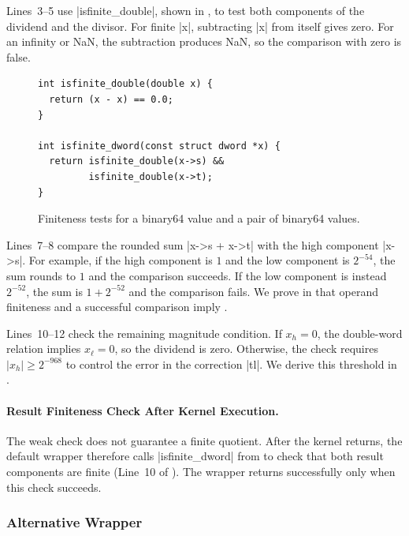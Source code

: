 Lines~3--5 use \ccode|isfinite_double|, shown in
, to test both components of the dividend and
the divisor. For finite \ccode|x|, subtracting \ccode|x| from itself
gives zero. For an infinity or NaN, the subtraction produces NaN,
so the comparison with zero is false.

\begin{figure}[t]
  \begin{sectiontwocpanel}
  \begin{lstlisting}[style=sectiontwoc]
int isfinite_double(double x) {
  return (x - x) == 0.0;
}

int isfinite_dword(const struct dword *x) {
  return isfinite_double(x->s) &&
         isfinite_double(x->t);
}
\end{lstlisting}
  \end{sectiontwocpanel}
\caption{Finiteness tests for a binary64 value and a pair of
binary64 values.}
  \label{fig:finite-checks}
\end{figure}

Lines~7--8 compare the rounded sum \ccode|x->s + x->t| with the high
component \ccode|x->s|. For example, if the high component is $1$ and
the low component is $2^{-54}$, the sum rounds to $1$ and the comparison
succeeds. If the low component is instead $2^{-52}$, the sum is
$1+2^{-52}$ and the comparison fails. We prove in
 that operand finiteness and a successful
comparison imply .

Lines~10--12 check the remaining magnitude condition. If $x_h=0$,
the double-word relation implies $x_\ell=0$, so the dividend is zero.
Otherwise, the check requires $|x_h|\geq2^{-968}$ to control the error
in the correction \ccode|tl|. We derive this threshold in
.

\begingroup
\setlength{\emergencystretch}{1em}
\paragraph{Result Finiteness Check After Kernel Execution.}
The weak check does not guarantee a finite quotient. After the kernel
returns, the default wrapper therefore calls \ccode|isfinite_dword|
from  to check that both result components are
finite (Line~10 of ). The wrapper
returns successfully only when this check succeeds.
\par
\endgroup

\subsubsection{Alternative Wrapper}
\label{sec:overview-strong-check}

